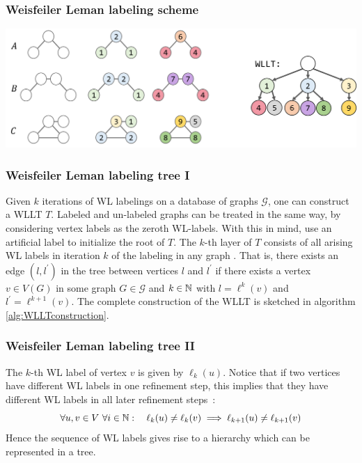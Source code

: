 \begin{frame}
\frametitle{Weisfeiler Leman labeling scheme}
\centering
\includegraphics[width=1.0\textwidth]{images/WL_labeling_iterations}
\end{frame}

\begin{frame} \frametitle{Weisfeiler Leman labeling tree I}
	Given $k$ iterations of WL labelings on a database of graphs $\mathcal{G}$, one can construct a WLLT $T$.
	Labeled and un-labeled graphs can be treated in the same way, by considering vertex labels as the zeroth WL-labels.
	With this in mind, use an artificial label to initialize the root of $T$. 
	The $k$-th layer of $T$ consists of all arising WL labels in iteration $k$ of the labeling in any graph .
	That is, there exists an edge $(l,l^\prime)$ in the tree between vertices $l$ and $l^\prime$ if there exists a vertex $v\in V(G)$ in some graph $G\in\mathcal{G}$ and $k\in\mathbb{N}$ with $l=\ell^k(v)$ and $l^\prime=\ell^{k+1}(v)$.
	The complete construction of the WLLT is sketched in algorithm \ref{alg:WLLTconstruction}.
\end{frame}

\begin{frame} \frametitle{Weisfeiler Leman labeling tree II}	
	The $k$-th WL label of vertex $v$ is given by $\ell_k(u)$.
	Notice that if two vertices have different WL labels in one refinement step, this implies that they have different WL labels in all later refinement steps~\cite{1968_Weisfeiler_CONF, 2016_Kriege_NIPS}:
	\[ \forall u,v \in V \ \forall i\in \mathbb{N}: \quad \ell_k(u)\neq \ell_k(v) \implies \ell_{k+1}(u)\neq \ell_{k+1}(v) \]
	Hence the sequence of WL labels gives rise to a hierarchy which can be represented in a tree.
\end{frame}

